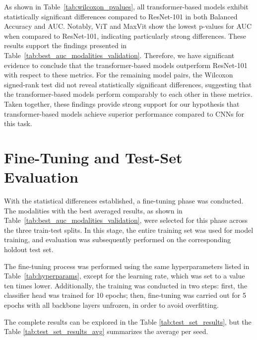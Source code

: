 \documentclass[a4paper,10pt]{book}
\begin{document}
As shown in Table~\ref{tab:wilcoxon_pvalues}, all transformer-based models exhibit statistically significant differences compared to ResNet-101 in both Balanced Accuracy and AUC. Notably, ViT and MaxVit show the lowest p-values for AUC when compared to ResNet-101, indicating particularly strong differences. These results support the findings presented in Table~\ref{tab:best_auc_modalities_validation}. Therefore, we have significant evidence to conclude that the transformer-based models outperform ResNet-101 with respect to these metrics. For the remaining model pairs, the Wilcoxon signed-rank test did not reveal statistically significant differences, suggesting that the transformer-based models perform comparably to each other in these metrics. Taken together, these findings provide strong support for our hypothesis that transformer-based models achieve superior performance compared to CNNs for this task.

\section{Fine-Tuning and Test-Set Evaluation}

With the statistical differences established, a fine-tuning phase was conducted. The modalities with the best averaged results, as shown in Table~\ref{tab:best_auc_modalities_validation}, were selected for this phase across the three train-test splits. In this stage, the entire training set was used for model training, and evaluation was subsequently performed on the corresponding holdout test set. 

The fine-tuning process was performed using the same hyperparameters listed in Table~\ref{tab:hyperparams}, except for the learning rate, which was set to a value ten times lower. Additionally, the training was conducted in two steps: first, the classifier head was trained for 10 epochs; then, fine-tuning was carried out for 5 epochs with all backbone layers unfrozen, in order to avoid overfitting.

The complete results can be explored in the Table \ref{tab:test_set_results}, but the Table \ref{tab:test_set_results_avg} summarizes the average per seed.
\end{document}
